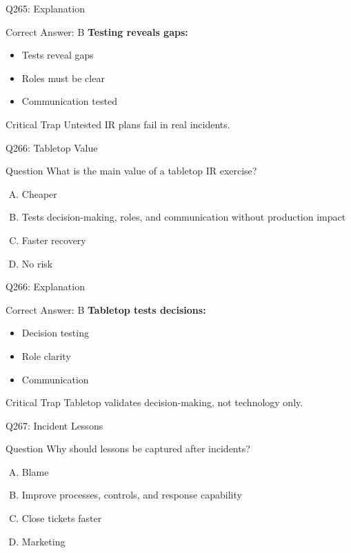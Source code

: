 \documentclass{beamer}
\begin{document}
	\begin{frame}{Q265: Explanation}
		\begin{block}{Correct Answer: B}
			\textbf{Testing reveals gaps:}
			\begin{itemize}
				\item Tests reveal gaps
				\item Roles must be clear
				\item Communication tested
			\end{itemize}
		\end{block}
		\begin{alertblock}{Critical Trap}
			Untested IR plans fail in real incidents.
		\end{alertblock}
	\end{frame}
	
	\begin{frame}{Q266: Tabletop Value}
		\begin{block}{Question}
			What is the main value of a tabletop IR exercise?
		\end{block}
		\begin{enumerate}[(A)]
			\item Cheaper
			\item Tests decision-making, roles, and communication without production impact
			\item Faster recovery
			\item No risk
		\end{enumerate}
	\end{frame}
	
	\begin{frame}{Q266: Explanation}
		\begin{block}{Correct Answer: B}
			\textbf{Tabletop tests decisions:}
			\begin{itemize}
				\item Decision testing
				\item Role clarity
				\item Communication
			\end{itemize}
		\end{block}
		\begin{alertblock}{Critical Trap}
			Tabletop validates decision-making, not technology only.
		\end{alertblock}
	\end{frame}
	
	\begin{frame}{Q267: Incident Lessons}
		\begin{block}{Question}
			Why should lessons be captured after incidents?
		\end{block}
		\begin{enumerate}[(A)]
			\item Blame
			\item Improve processes, controls, and response capability
			\item Close tickets faster
			\item Marketing
		\end{enumerate}
	\end{frame}
	
\end{document}
